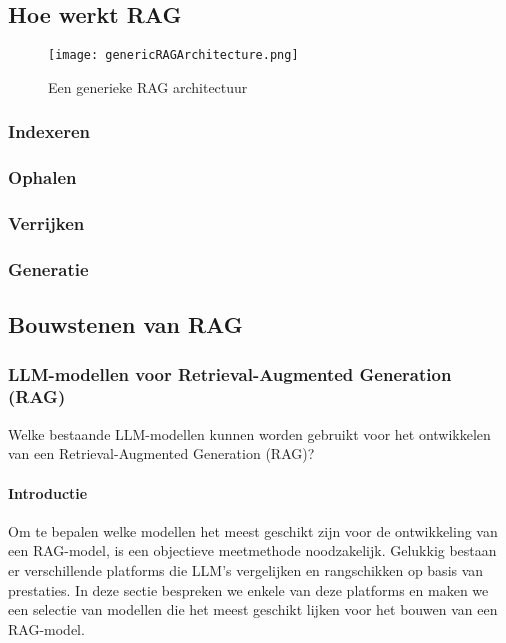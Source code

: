     \subsection{Hoe werkt RAG}
    
     \begin{figure}[H]
        \centering
        \texttt{[image: genericRAGArchitecture.png]}
        \caption{Een generieke RAG architectuur \cite{Zhao2024}}
        \label{fig:livebench}
    \end{figure}
    
        \subsubsection{Indexeren}
        \subsubsection{Ophalen}
        \subsubsection{Verrijken}
        \subsubsection{Generatie}
    
    
    \subsection{Bouwstenen van RAG}
    
    
        \subsubsection{LLM-modellen voor Retrieval-Augmented Generation (RAG)}
        Welke bestaande LLM-modellen kunnen worden gebruikt voor het ontwikkelen van een Retrieval-Augmented Generation (RAG)? 
        
        
        \paragraph{Introductie}
        Om te bepalen welke modellen het meest geschikt zijn voor de ontwikkeling van een RAG-model, is een objectieve meetmethode noodzakelijk. Gelukkig bestaan er verschillende platforms die LLM's vergelijken en rangschikken op basis van prestaties. In deze sectie bespreken we enkele van deze platforms en maken we een selectie van modellen die het meest geschikt lijken voor het bouwen van een RAG-model.
        
